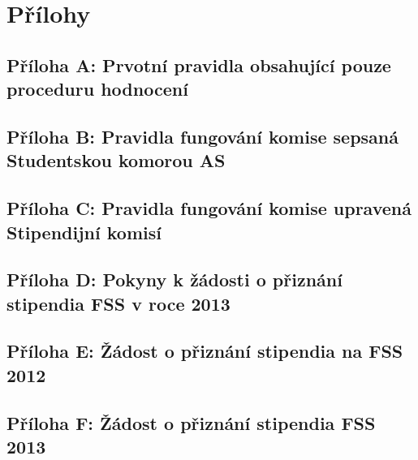 
\chapter{Přílohy}

\section{Příloha A: Prvotní pravidla obsahující pouze proceduru hodnocení}


\newpage
\section{Příloha B: Pravidla fungování komise sepsaná Studentskou komorou AS}


\newpage
\section{Příloha C: Pravidla fungování komise upravená Stipendijní komisí}


\newpage
\section{Příloha D: Pokyny k žádosti o přiznání stipendia FSS v roce 2013}


\newpage
\section{Příloha E: Žádost o přiznání stipendia na FSS 2012}


\newpage
\section{Příloha F: Žádost o přiznání stipendia FSS 2013}
